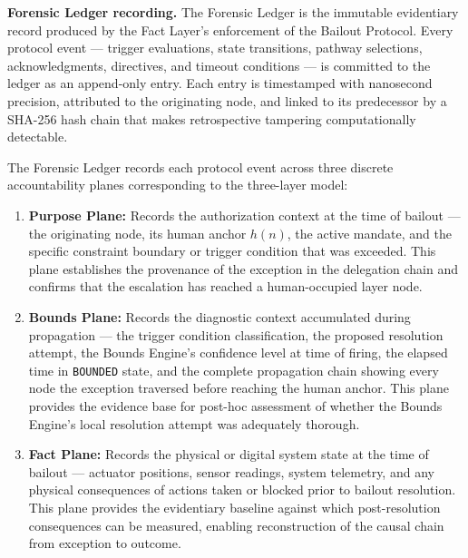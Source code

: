 \bigskip
\noindent\textbf{Forensic Ledger recording.} The Forensic Ledger is the immutable evidentiary record produced by the Fact Layer's enforcement of the Bailout Protocol. Every protocol event — trigger evaluations, state transitions, pathway selections, acknowledgments, directives, and timeout conditions — is committed to the ledger as an append-only entry. Each entry is timestamped with nanosecond precision, attributed to the originating node, and linked to its predecessor by a SHA-256 hash chain that makes retrospective tampering computationally detectable.

The Forensic Ledger records each protocol event across three discrete accountability planes corresponding to the \bxthree{} three-layer model:

\begin{enumerate}\itemsep=0pt
\item \textbf{Purpose Plane:} Records the authorization context at the time of bailout — the originating node, its human anchor $h(n)$, the active mandate, and the specific constraint boundary or trigger condition that was exceeded. This plane establishes the provenance of the exception in the delegation chain and confirms that the escalation has reached a human-occupied \purpose{} layer node.

\item \textbf{Bounds Plane:} Records the diagnostic context accumulated during propagation — the trigger condition classification, the proposed resolution attempt, the Bounds Engine's confidence level at time of firing, the elapsed time in \texttt{BOUNDED} state, and the complete propagation chain showing every node the exception traversed before reaching the human anchor. This plane provides the evidence base for post-hoc assessment of whether the Bounds Engine's local resolution attempt was adequately thorough.

\item \textbf{Fact Plane:} Records the physical or digital system state at the time of bailout — actuator positions, sensor readings, system telemetry, and any physical consequences of actions taken or blocked prior to bailout resolution. This plane provides the evidentiary baseline against which post-resolution consequences can be measured, enabling reconstruction of the causal chain from exception to outcome.
\end{enumerate}

